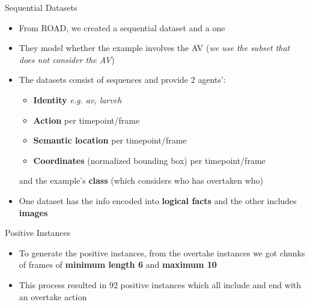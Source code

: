 \documentclass[10pt, aspectratio=169]{beamer}
\begin{document}
\begin{frame}{Sequential Datasets}
    \begin{itemize}
        \setlength{\itemsep}{12pt}
        \item  From ROAD, we created a  sequential dataset and a  one
        \item  They model whether the example involves the AV (\textit{we use the subset that does not consider the AV}) %
        \item The datasets consist of sequences  and provide \textcolor{umBlueLighter}{2 agents'}:
        \vspace{6pt}
        \begin{itemize}
            \setlength{\itemsep}{3pt}
            \item \textbf{Identity} \textit{e.g. av, larveh}
            \item \textbf{Action} per timepoint/frame
            \item \textbf{Semantic location} per timepoint/frame
            \item \textbf{Coordinates} (normalized bounding box) per timepoint/frame
        \end{itemize}
        \vspace{6pt}
        and the example's \textbf{class} (which considers who has overtaken who)
        \item One dataset has the info encoded into \textbf{logical facts} and the other includes \textbf{images}
    \end{itemize}
\end{frame}



\begin{frame}{Positive Instances}
    \begin{itemize}
        \setlength{\itemsep}{16pt}
        \item To generate the positive instances, from the overtake instances we got chunks of frames of \textbf{minimum length 6} and\textbf{ maximum 10} %
        \item This process resulted in \textcolor{umBlueLighter}{92 positive instances}  which all include and end with an overtake action
    \end{itemize}
\end{frame}
\end{document}
